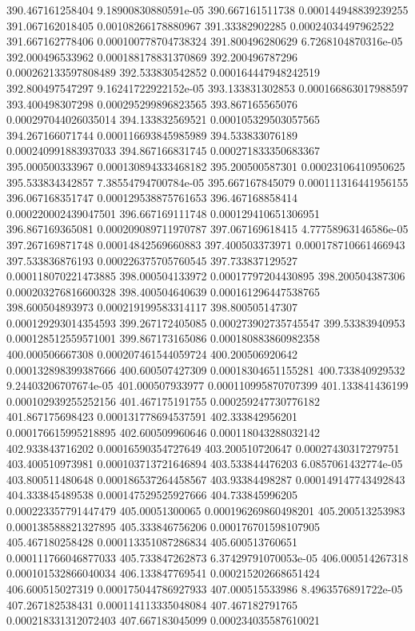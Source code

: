 {390.467161258404 9.18900830880591e-05
390.667161511738 0.000144948839239255
391.067162018405 0.00108266178880967
391.33382902285 0.00024034497962522
391.667162778406 0.000100778704738324
391.800496280629 6.7268104870316e-05
392.000496533962 0.000188178831370869
392.200496787296 0.000262133597808489
392.533830542852 0.000164447948242519
392.800497547297 9.16241722922152e-05
393.133831302853 0.000166863017988597
393.400498307298 0.000295299896823565
393.867165565076 0.000297044026035014
394.133832569521 0.000105329503057565
394.267166071744 0.000116693845985989
394.533833076189 0.000240991883937033
394.867166831745 0.000271833350683367
395.000500333967 0.000130894333468182
395.200500587301 0.00023106410950625
395.533834342857 7.38554794700784e-05
395.667167845079 0.000111316441956155
396.067168351747 0.000129538875761653
396.467168858414 0.000220002439047501
396.667169111748 0.000129410651306951
396.867169365081 0.000209089711970787
397.067169618415 4.77758963146586e-05
397.267169871748 0.00014842569660883
397.400503373971 0.000178710661466943
397.533836876193 0.000226375705760545
397.733837129527 0.000118070221473885
398.000504133972 0.00017797204430895
398.200504387306 0.000203276816600328
398.400504640639 0.000161296447538765
398.600504893973 0.000219199583314117
398.800505147307 0.000129293014354593
399.267172405085 0.000273902735745547
399.53383940953 0.000128512559571001
399.867173165086 0.000180883860982358
400.000506667308 0.000207461544059724
400.200506920642 0.000132898399387666
400.600507427309 0.00018304651155281
400.733840929532 9.24403206707674e-05
401.000507933977 0.000110995870707399
401.133841436199 0.000102939255252156
401.467175191755 0.000259247730776182
401.867175698423 0.000131778694537591
402.333842956201 0.000176615995218895
402.600509960646 0.000118043288032142
402.933843716202 0.00016590354727649
403.200510720647 0.00027430317279751
403.400510973981 0.000103713721646894
403.533844476203 6.0857061432774e-05
403.800511480648 0.000186537264458567
403.93384498287 0.000149147743492843
404.333845489538 0.000147529525927666
404.733845996205 0.000223357791447479
405.00051300065 0.000196269860498201
405.200513253983 0.000138588821327895
405.333846756206 0.000176701598107905
405.467180258428 0.000113351087286834
405.600513760651 0.000111766046877033
405.733847262873 6.37429791070053e-05
406.000514267318 0.000101532866040034
406.133847769541 0.000215202668651424
406.600515027319 0.000175044786927933
407.000515533986 8.4963576891722e-05
407.267182538431 0.000114113335048084
407.467182791765 0.000218331312072403
407.667183045099 0.000234035587610021
}
